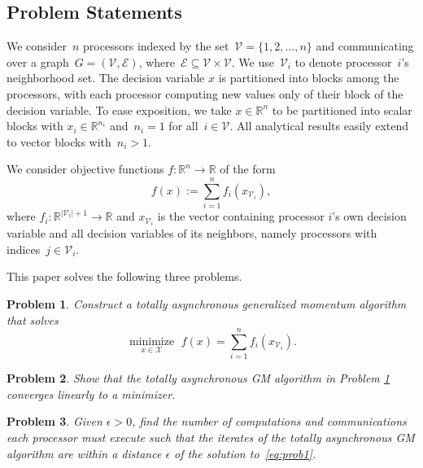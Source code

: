 \documentclass[9pt,shortpaper,twoside,web]{ieeecolor}
\newcommand{\R}{\ensuremath{\mathbb{R}}\xspace}
\newcommand{\X}{\ensuremath{\mathcal{X}}\xspace}
\newcommand{\V}{\ensuremath{\mathcal{V}}\xspace}
\newcommand{\E}{\ensuremath{\mathcal{E}}\xspace}
\newtheorem{problem}{Problem}
\begin{document}
\subsection{Problem Statements}
We consider~$n$ processors indexed by the set~$\V = \{1,2,\dots,n\}$ 
and communicating over a graph~$G = (\V, \E)$, where~$\E \subseteq \V \times \V$. 
We use~$\V_i$ to denote processor~$i$'s neighborhood set. 
The decision variable $x$ is partitioned into blocks among the processors, 
with each processor computing new values only of their block of the decision variable.
To ease exposition, we take $x \in \R^n$ to be partitioned into scalar blocks with
$x_i \in \R^{n_i}$ and~$n_i = 1$ for all~$i \in \V$. All analytical
results easily extend to vector blocks with~$n_i > 1$. 
    
We consider objective functions $f:\R^n\rightarrow \R$ of the form
\begin{equation} \label{eq:objfunc}
    f(x) := \sum_{i=1}^n f_i(x_{\V_i}),
\end{equation}
where $f_i:\R^{\vert \V_i\vert+1}\rightarrow \R$ and $x_{\V_i}$ is the vector containing processor $i$'s own decision variable and all decision 
variables of its neighbors, namely processors with indices~$j \in \V_i$.

This paper solves the following three problems. 

\begin{problem}\label{prob:1}
    Construct a totally asynchronous generalized momentum algorithm that solves
    \begin{equation} \label{eq:prob1}
        \underset{x \in \X}{\operatorname{minimize}} \,\, f(x) = \sum_{i=1}^nf_i(x_{\V_i}). 
    \end{equation}    
\end{problem}

\begin{problem}\label{prob:2}
    Show that the totally asynchronous GM algorithm in Problem \ref{prob:1} converges linearly to a minimizer.
\end{problem}

\begin{problem}\label{prob:3}
    Given $\epsilon > 0$, find the number of computations and communications each processor must execute 
    such that the iterates of the totally asynchronous GM algorithm are within a distance $\epsilon$ of the solution to~\eqref{eq:prob1}. 
\end{problem}
\end{document}
